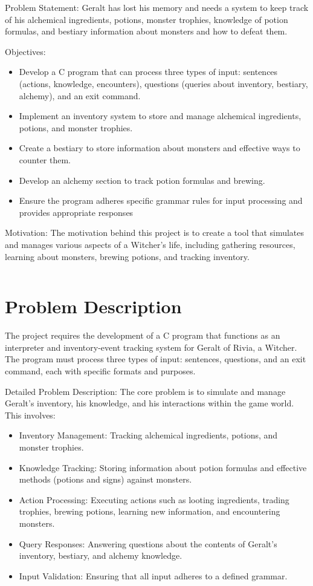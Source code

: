 \documentclass[12pt,a4paper]{article}
\begin{document}
Problem Statement:  
Geralt has lost his memory and needs a system to keep track of his alchemical ingredients,  
potions, monster trophies, knowledge of potion formulas, and bestiary information about  
monsters and how to defeat them.

Objectives:
\begin{itemize}
  \item Develop a C program that can process three types of input: sentences (actions, knowledge, encounters), questions (queries about inventory, bestiary, alchemy), and an exit command.
  \item Implement an inventory system to store and manage alchemical ingredients, potions, and monster trophies.
  \item Create a bestiary to store information about monsters and effective ways to counter them.
  \item Develop an alchemy section to track potion formulas and brewing.
  \item Ensure the program adheres specific grammar rules for input processing and provides appropriate responses
\end{itemize}

Motivation:  
The motivation behind this project is to create a tool that simulates and manages various aspects of a Witcher's life, including gathering resources, learning about monsters, brewing potions, and tracking inventory.

\begin{verbatim}

\end{verbatim}

\section{Problem Description}
The project requires the development of a C program that functions as an interpreter and inventory-event tracking system for Geralt of Rivia, a Witcher. The program must process three types of input: sentences, questions, and an exit command, each with specific formats and purposes.

Detailed Problem Description:  
The core problem is to simulate and manage Geralt's inventory, his knowledge, and his interactions within the game world. This involves:
\begin{itemize}
  \item Inventory Management: Tracking alchemical ingredients, potions, and monster trophies.
  \item Knowledge Tracking: Storing information about potion formulas and effective methods (potions and signs) against monsters.
  \item Action Processing: Executing actions such as looting ingredients, trading trophies, brewing potions, learning new information, and encountering monsters.
  \item Query Responses: Answering questions about the contents of Geralt's inventory, bestiary, and alchemy knowledge.
  \item Input Validation: Ensuring that all input adheres to a defined grammar.
\end{itemize}
\end{document}
